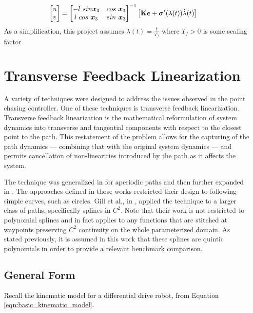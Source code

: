 \documentclass[oneside, 11pt]{book}
\begin{document}
\begin{align*}
    \begin{bmatrix}
        u \\ v
    \end{bmatrix}   &=  \begin{bmatrix}
                            -l~sin\bm{x}_3 & cos~\bm{x}_3 \\
                            l~cos~\bm{x}_3 & sin~\bm{x}_3 \\
                        \end{bmatrix}^{-1}
                        \left[
                            \mathbf{K}\bm{e} + \bm{\sigma}'(\lambda(t))\dot{\lambda}(t)
                        \right]
\end{align*}
As a simplification, this project assumes $\lambda(t)=\frac{t}{T_f}$ where $T_f > 0$ is some scaling factor.

\section{Transverse Feedback Linearization}
A variety of techniques were designed to address the issues observed in the point chasing controller. One of these techniques is transverse feedback linearization. Transverse feedback linearization is the mathematical reformulation of system dynamics into transverse and tangential components with respect to the closest point to the path. This restatement of the problem allows for the capturing of the path dynamics --- combining that with the original system dynamics --- and permits cancellation of non-linearities introduced by the path as it affects the system.

The technique was generalized in \cite{Nielsen06} for aperiodic paths and then further expanded in \cite{Hladio13}. The approaches defined in those works restricted their design to following simple curves, such as circles. Gill et al., in \cite{Gill15}, applied the technique to a larger class of paths, specifically splines in $C^2$. Note that their work is not restricted to polynomial splines and in fact applies to any functions that are stitched at waypoints preserving $C^2$ continuity on the whole parameterized domain. As stated previously, it is assumed in this work that these splines are quintic polynomials in order to provide a relevant benchmark comparison.

\subsection{General Form}\label{sec:general_tfl}
Recall the kinematic model for a differential drive robot, from Equation \ref{eqn:basic_kinematic_model}.
\end{document}
